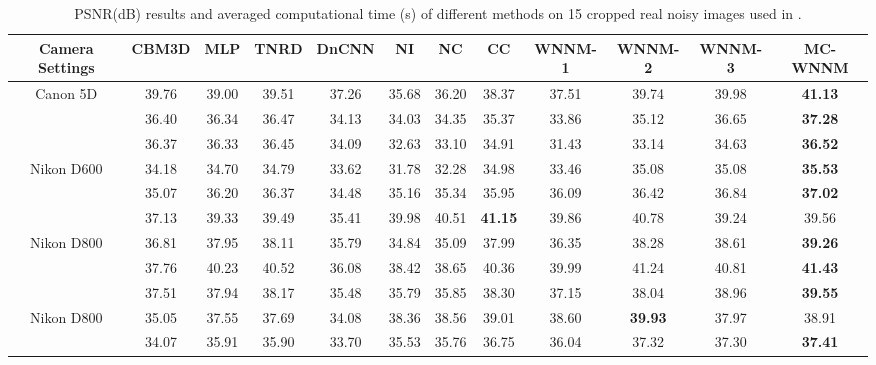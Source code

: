 \begin{table}
\caption{PSNR(dB) results and averaged computational time (s) of different methods on 15 cropped real noisy images used in \cite{crosschannel2016}.}
\label{t2}
\label{tabb}
\begin{center}
\renewcommand\arraystretch{1}
\scriptsize
\begin{tabular}{|c||c|c|c|c|c|c|c|c|c|c|c|}
\hline
Camera Settings  
&
\textbf{CBM3D}
&
\textbf{MLP}
&
\textbf{TNRD}
&
\textbf{DnCNN}
&
\textbf{NI}
&
\textbf{NC}
&
\textbf{CC}
&
\textbf{WNNM-1}
&
\textbf{WNNM-2}
&
\textbf{WNNM-3}
&
\textbf{MC-WNNM} 
\\
\hline
\multirow{3}{*}{\small{Canon 5D}} %
& 39.76 & 39.00 & 39.51 & 37.26 & 35.68 & 36.20 & 38.37 & 37.51 & 39.74 & 39.98 & \textbf{41.13}
\\ 
\cline{2-12} 
\multirow{3}{*}{ISO = 3200}   
& 36.40 & 36.34 & 36.47 & 34.13 & 34.03 & 34.35 & 35.37 & 33.86 & 35.12 & 36.65 & \textbf{37.28}
\\ 
\cline{2-12}    
& 36.37 & 36.33 & 36.45 & 34.09 & 32.63 & 33.10 & 34.91 & 31.43 & 33.14 & 34.63 & \textbf{36.52}  
\\
\hline
\multirow{3}{*}{Nikon D600} 
& 34.18 & 34.70 & 34.79 & 33.62 & 31.78 & 32.28 & 34.98 & 33.46 & 35.08 & 35.08 & \textbf{35.53}
\\ 
\cline{2-12} 
\multirow{3}{*}{ISO = 3200}   
& 35.07 & 36.20 & 36.37 & 34.48 & 35.16 & 35.34 & 35.95 & 36.09 & 36.42 & 36.84 & \textbf{37.02}
\\ 
\cline{2-12}    
& 37.13 & 39.33 & 39.49 & 35.41 & 39.98 & 40.51 & \textbf{41.15} & 39.86 & 40.78 & 39.24 & 39.56
\\
\hline
\multirow{3}{*}{Nikon D800} 
& 36.81  & 37.95 & 38.11 & 35.79 & 34.84 & 35.09 & 37.99 & 36.35 & 38.28 & 38.61 & \textbf{39.26}
\\ 
\cline{2-12} 
\multirow{3}{*}{ISO = 1600}   
& 37.76 & 40.23 & 40.52 & 36.08 & 38.42 & 38.65 & 40.36 & 39.99 & 41.24 & 40.81 & \textbf{41.43}
\\ 
\cline{2-12}    
& 37.51 & 37.94 & 38.17 & 35.48 & 35.79 & 35.85 & 38.30 & 37.15 & 38.04 & 38.96 & \textbf{39.55}
\\
\hline
\multirow{3}{*}{Nikon D800} 
& 35.05 & 37.55 & 37.69 & 34.08 & 38.36 & 38.56 & 39.01 & 38.60 & \textbf{39.93} & 37.97 & 38.91
\\ 
\cline{2-12} 
\multirow{3}{*}{ISO = 3200}   
& 34.07 & 35.91 & 35.90 & 33.70 & 35.53 & 35.76 & 36.75 & 36.04 & 37.32 & 37.30 & \textbf{37.41}
\\ 

\end{tabular}
\end{center}
\end{table}
